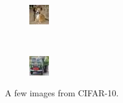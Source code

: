 \documentclass[11pt]{article}
\begin{document}
\begin{figure}
    \centering
    \begin{subfigure}[b]{0.15\textwidth}
        \includegraphics[width=\textwidth]{image0.jpeg}
    \end{subfigure}
    ~
    \begin{subfigure}[b]{0.15\textwidth}
        \includegraphics[width=\textwidth]{image3.jpeg}
    \end{subfigure}
    \caption{A few images from CIFAR-10.}
    \label{fig:cifar10_images}
\end{figure}
\end{document}
